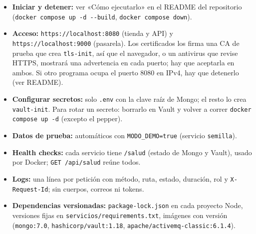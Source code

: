 \begin{itemize}[nosep,leftmargin=*]
\item \textbf{Iniciar y detener:} ver «Cómo ejecutarlo» en el README del repositorio (\texttt{docker compose up -\allowbreak{}d -\allowbreak{}-\allowbreak{}build}, \texttt{docker compose down}).
\item \textbf{Acceso:} \texttt{https:\allowbreak{}/\allowbreak{}/\allowbreak{}localhost:\allowbreak{}8080} (tienda y API) y \texttt{https:\allowbreak{}/\allowbreak{}/\allowbreak{}localhost:\allowbreak{}9000} (pasarela). Los certificados los firma una CA de prueba que crea \texttt{tls-\allowbreak{}init}, así que el navegador, o un antivirus que revise HTTPS, mostrará una advertencia en cada puerto; hay que aceptarla en ambos. Si otro programa ocupa el puerto 8080 en IPv4, hay que detenerlo (ver README).
\item \textbf{Configurar secretos:} solo \texttt{.\allowbreak{}env} con la clave raíz de Mongo; el resto lo crea \texttt{vault-\allowbreak{}init}. Para rotar un secreto: borrarlo en Vault y volver a correr \texttt{docker compose up -\allowbreak{}d} (excepto el pepper).
\item \textbf{Datos de prueba:} automáticos con \texttt{MODO\_\allowbreak{}DEMO=\allowbreak{}true} (servicio \texttt{semilla}).
\item \textbf{Health checks:} cada servicio tiene \texttt{/\allowbreak{}salud} (estado de Mongo y Vault), usado por Docker; \texttt{GET /\allowbreak{}api/\allowbreak{}salud} reúne todos.
\item \textbf{Logs:} una línea por petición con método, ruta, estado, duración, rol y \texttt{X-\allowbreak{}Request-\allowbreak{}Id}; sin cuerpos, correos ni tokens.
\item \textbf{Dependencias versionadas:} \texttt{package-\allowbreak{}lock.\allowbreak{}json} en cada proyecto Node, versiones fijas en \texttt{servicios/\allowbreak{}requirements.\allowbreak{}txt}, imágenes con versión (\texttt{mongo:\allowbreak{}7.\allowbreak{}0}, \texttt{hashicorp/\allowbreak{}vault:\allowbreak{}1.\allowbreak{}18}, \texttt{apache/\allowbreak{}activemq-\allowbreak{}classic:\allowbreak{}6.\allowbreak{}1.\allowbreak{}4}).
\end{itemize}
